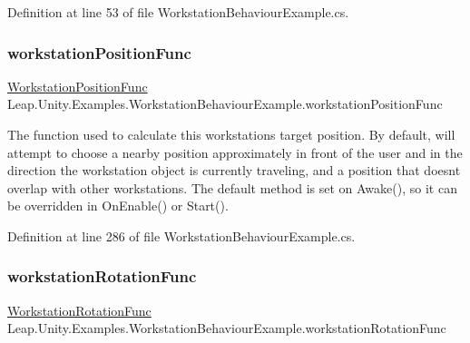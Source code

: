 Definition at line 53 of file Workstation\+Behaviour\+Example.\+cs.

\mbox{\label{class_leap_1_1_unity_1_1_examples_1_1_workstation_behaviour_example_acaf79ab190ba66fba74bb2eba58998ca}} 
\subsubsection{\texorpdfstring{workstationPositionFunc}{workstationPositionFunc}}
{\footnotesize\ttfamily \mbox{\hyperlink{class_leap_1_1_unity_1_1_examples_1_1_workstation_behaviour_example_aa1eb03a23e58150cbb75aee152bb4d33}{Workstation\+Position\+Func}} Leap.\+Unity.\+Examples.\+Workstation\+Behaviour\+Example.\+workstation\+Position\+Func}



The function used to calculate this workstation\textquotesingle{}s target position. By default, will attempt to choose a nearby position approximately in front of the user and in the direction the workstation object is currently traveling, and a position that doesn\textquotesingle{}t overlap with other workstations. The default method is set on Awake(), so it can be overridden in On\+Enable() or Start(). 



Definition at line 286 of file Workstation\+Behaviour\+Example.\+cs.

\mbox{\label{class_leap_1_1_unity_1_1_examples_1_1_workstation_behaviour_example_aa4075ce7f97ba3a7c7184940e0add199}} 
\subsubsection{\texorpdfstring{workstationRotationFunc}{workstationRotationFunc}}
{\footnotesize\ttfamily \mbox{\hyperlink{class_leap_1_1_unity_1_1_examples_1_1_workstation_behaviour_example_a96412e8fc922be4561a1017293783c9a}{Workstation\+Rotation\+Func}} Leap.\+Unity.\+Examples.\+Workstation\+Behaviour\+Example.\+workstation\+Rotation\+Func}



